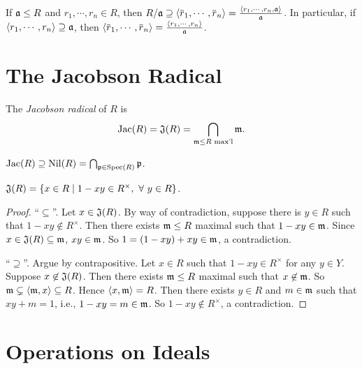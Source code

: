 \begin{fact*}
    If $\mathfrak{a} \leq R$ and $r_1,\cdots,r_n \in R$, then $R/\ffa \supseteq \langle \overbar r_1,\cdots,\overbar r_n \rangle = \frac{\langle r_1,\cdots,r_n, \ffa \rangle}{\ffa}$. In particular, if $\langle r_1,\cdots,r_n \rangle \supseteq \mathfrak{a}$, then $\langle \overbar r_1, \cdots, \overbar r_n \rangle = \frac{\langle r_1,\cdots,r_n \rangle}{\ffa}$.
\end{fact*}

\section*{The Jacobson Radical}

\begin{definition}
    The \emph{Jacobson radical} of $R$ is 
    \[\operatorname{Jac}(R) = \mathfrak{J}(R) = \bigcap_{\mathfrak{m} \leq R \text{ max'l}}\mathfrak{m}.\]
\end{definition}

\begin{fact}
    $\operatorname{Jac}(R) \supseteq \operatorname{Nil}(R) = \bigcap_{\mathfrak{p} \in \operatorname{Spec}(R)}\mathfrak{p}$.
\end{fact}

\begin{proposition}
    $\mathfrak{J}(R) = \{x \in R \mid 1-xy \in R^\times, \ \forall \  y \in R\}$.
\end{proposition}

\begin{proof}
    ``$\subseteq$''. Let $x \in \mathfrak{J}(R)$. By way of contradiction, suppose there is $y \in R$ such that $1-xy \not \in R^\times$. Then there exists $\mathfrak{m} \leq R$ maximal such that $1-xy \in \mathfrak{m}$. Since $x \in \mathfrak{J}(R) \subseteq \mathfrak{m}$, $xy \in \mathfrak{m}$. So $1 = (1-xy) + xy \in \mathfrak{m}$, a contradiction. \par
    ``$\supseteq$''. Argue by contrapositive. Let $x \in R$ such that $1-xy \in R^\times$ for any $y \in Y$. Suppose $x \not \in \mathfrak{J}(R)$. Then there exists $\mathfrak{m} \leq R$ maximal such that $x \not \in \mathfrak{m}$. So $\mathfrak{m} \subsetneq \langle \mathfrak{m}, x \rangle \subseteq R$. Hence $\langle x,\mathfrak{m} \rangle = R$. Then there exists $y \in R$ and $m \in \mathfrak{m}$ such that $xy+m = 1$, i.e., $1-xy = m \in \mathfrak{m}$. So $1-xy \not \in R^\times$, a contradiction.
\end{proof}

\section*{Operations on Ideals}

